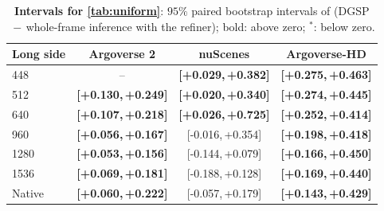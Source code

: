 \documentclass[10pt,letterpaper]{article}
\newcommand{\method}{DGSP\xspace}
\newcommand{\ci}[2]{[#1,\allowbreak\,#2]}
\newcommand{\best}[1]{\textbf{#1}}
\newcommand{\na}{--}
\newcommand{\sw}{$^{\ast}$}   %
\theoremstyle{remark}
\theoremstyle{plain}
\theoremstyle{definition}
\begin{document}
\begin{table}[!tbp]
\centering
\caption{\textbf{Intervals for \cref{tab:uniform}}: $95\%$ paired bootstrap intervals of (\method$\,-\,$whole-frame inference with the refiner); bold: above zero; \sw: below zero.}
\label{tab:uniform_ci}
\small
\setlength{\tabcolsep}{2.5pt}
\begin{tabular}{@{}lccc@{}}
\toprule
Long side & Argoverse 2 & nuScenes & Argoverse-HD \\
\midrule
448 & \na & \best{\ci{+0.029}{+0.382}} & \best{\ci{+0.275}{+0.463}} \\
512 & \best{\ci{+0.130}{+0.249}} & \best{\ci{+0.020}{+0.340}} & \best{\ci{+0.274}{+0.445}} \\
640 & \best{\ci{+0.107}{+0.218}} & \best{\ci{+0.026}{+0.725}} & \best{\ci{+0.252}{+0.414}} \\
960 & \best{\ci{+0.056}{+0.167}} & \ci{-0.016}{+0.354} & \best{\ci{+0.198}{+0.418}} \\
1280 & \best{\ci{+0.053}{+0.156}} & \ci{-0.144}{+0.079} & \best{\ci{+0.166}{+0.450}} \\
1536 & \best{\ci{+0.069}{+0.181}} & \ci{-0.188}{+0.128} & \best{\ci{+0.169}{+0.440}} \\
Native & \best{\ci{+0.060}{+0.222}} & \ci{-0.057}{+0.179} & \best{\ci{+0.143}{+0.429}} \\
\bottomrule
\end{tabular}
\end{table}
\end{document}
